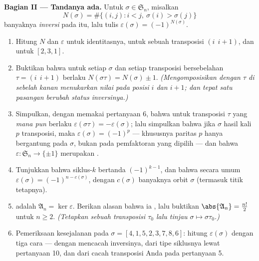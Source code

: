 \begin{problem}
\medskip
\noindent\textbf{Bagian II --- Tandanya ada.} Untuk $\sigma
\in \mathfrak S_n$, misalkan
\[
N(\sigma) = \#\bigl\{(i, j) : i < j,\ \sigma(i) >
\sigma(j)\bigr\}
\]
banyaknya \emph{inversi} pada  itu, lalu tulis $\varepsilon(\sigma) =
(-1)^{N(\sigma)}$.
\begin{enumerate}[resume]
  \item Hitung $N$ dan $\varepsilon$ untuk identitasnya, untuk sebuah
        transposisi $(i\ \ i{+}1)$, dan untuk $[2, 3, 1]$.
  \item Buktikan bahwa untuk setiap $\sigma$ dan setiap transposisi
        bersebelahan $\tau = (i\ \ i{+}1)$ berlaku
        $N(\sigma\tau) = N(\sigma) \pm 1$. \emph{(Mengomposisikan dengan
        $\tau$ di sebelah kanan menukarkan nilai pada posisi $i$ dan
        $i + 1$; dan tepat satu pasangan berubah status
        inversinya.)}
  \item Simpulkan, dengan memakai pertanyaan 6, bahwa untuk transposisi
        $\tau$ yang \emph{mana pun} berlaku $\varepsilon(\sigma\tau) =
        -\varepsilon(\sigma)$; lalu simpulkan bahwa jika $\sigma$
        hasil kali $p$ transposisi, maka $\varepsilon(\sigma)
        = (-1)^p$ --- khususnya paritas $p$ hanya bergantung
        pada $\sigma$, bukan pada pemfaktoran yang dipilih --- dan bahwa
        $\varepsilon \colon \mathfrak S_n \to \{\pm 1\}$ merupakan
         .
  \item Tunjukkan bahwa siklus-$k$ bertanda $(-1)^{k-1}$, dan
        bahwa secara umum $\varepsilon(\sigma) = (-1)^{n -
        c(\sigma)}$, dengan $c(\sigma)$ banyaknya orbit
        $\sigma$ (termasuk titik tetapnya).
  \item \emph{} adalah $\mathfrak A_n =
        \ker\varepsilon$. Berikan alasan bahwa ia , lalu buktikan
        $\abs{\mathfrak A_n} = \frac{n!}2$ untuk $n \geq 2$.
        \emph{(Tetapkan sebuah transposisi $\tau_0$ lalu tinjau $\sigma
        \mapsto \sigma\tau_0$.)}
  \item Pemeriksaan kesejalanan pada $\sigma = [4, 1, 5, 2, 3, 7, 8, 6]$:
        hitung $\varepsilon(\sigma)$ dengan tiga cara --- dengan mencacah
        inversinya, dari tipe siklusnya lewat pertanyaan 10, dan dari
        cacah transposisi Anda pada pertanyaan 5.
\end{enumerate}


\end{problem}
